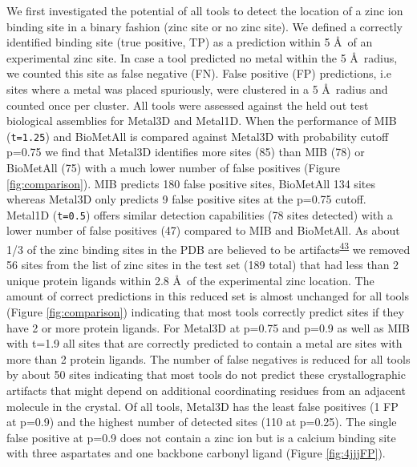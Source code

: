 \documentclass[  ASAPversion,
  ,
  9pt]{elife}
\begin{document}
We first investigated the potential of all tools to detect the location of a zinc ion binding site in a binary fashion (zinc site or no zinc site). We defined a correctly identified binding site (true positive, TP) as a prediction within 5 \AA\, of an experimental zinc site. In case a tool predicted no metal within the 5 \AA\, radius, we counted this site as false negative (FN). False positive (FP) predictions, i.e sites where a metal was placed spuriously, were clustered in a 5 \AA\, radius and counted once per cluster. All tools were assessed against the held out test biological assemblies for Metal3D and Metal1D. When the performance of MIB (\texttt{t=1.25}) and BioMetAll is compared against Metal3D with probability cutoff p=0.75 we find that Metal3D identifies more sites (85) than MIB (78) or BioMetAll (75) with a much lower number of false positives (Figure \ref{fig:comparison}).
MIB predicts 180 false positive sites, BioMetAll 134 sites whereas Metal3D only predicts 9 false positive sites at the p=0.75 cutoff. Metal1D (\texttt{t=0.5}) offers similar detection capabilities (78 sites detected) with a lower number of false positives (47) compared to MIB and BioMetAll.
As about 1/3 of the zinc binding sites in the PDB are believed to be artifacts\textsuperscript{\protect\hyperlink{ref-Wt0ducot}{43}} we removed 56 sites from the list of zinc sites in the test set (189 total) that had less than 2 unique protein ligands within 2.8 \AA\, of the experimental zinc location. The amount of correct predictions in this reduced set is almost unchanged for all tools (Figure \ref{fig:comparison}) indicating that most tools correctly predict sites if they have 2 or more protein ligands. For Metal3D at p=0.75 and p=0.9 as well as MIB with t=1.9 all sites that are correctly predicted to contain a metal are sites with more than 2 protein ligands. The number of false negatives is reduced for all tools by about 50 sites indicating that most tools do not predict these crystallographic artifacts that might depend on additional coordinating residues from an adjacent molecule in the crystal. Of all tools, Metal3D has the least false positives (1 FP at p=0.9) and the highest number of detected sites (110 at p=0.25). The single false positive at p=0.9 does not contain a zinc ion but is a calcium binding site with three aspartates and one backbone carbonyl ligand (Figure \ref{fig:4jjjFP}).
\end{document}
